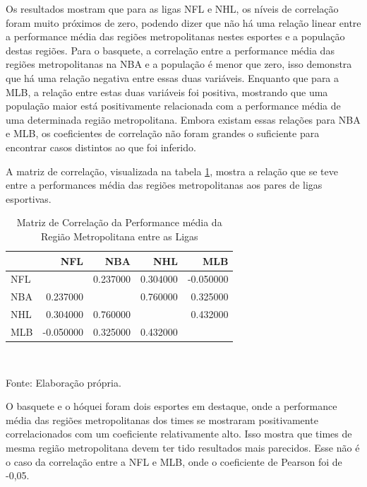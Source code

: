 \documentclass[12pt,oneside,a4paper,chapter=TITLE,english,brazil,sumario=abnt-6027-2012]{abntex2}
\begin{document}
	Os resultados mostram que para as ligas NFL e NHL, os níveis de correlação foram muito próximos de zero, podendo dizer que não há uma relação linear entre a performance média das regiões metropolitanas nestes esportes e a população destas regiões. Para o basquete, a correlação entre a performance média das regiões metropolitanas na NBA e a população é menor que zero, isso demonstra que há uma relação negativa entre essas duas variáveis. Enquanto que para a MLB, a relação entre estas duas variáveis foi positiva, mostrando que uma população maior está positivamente relacionada com a performance média de uma determinada região metropolitana. Embora existam essas relações para NBA e MLB, os coeficientes de correlação não foram grandes o suficiente para encontrar casos distintos ao que foi inferido.
	
	A matriz de correlação, visualizada na tabela \ref{tab:corr_matrix}, mostra a relação que se teve entre a performances média das regiões metropolitanas aos pares de ligas esportivas.

	\begin{table}[H]
	\centering
	\caption{Matriz de Correlação da Performance média da Região Metropolitana entre as Ligas}
	\begin{tabular}{lrrrr}
	& NFL & NBA & NHL & MLB \\\hline
	NFL &  & 0.237000 & 0.304000 & -0.050000 \\\hline
	NBA & 0.237000 &  & 0.760000 & 0.325000 \\\hline
	NHL & 0.304000 & 0.760000 &  & 0.432000 \\\hline
	MLB & -0.050000 & 0.325000 & 0.432000 &  \\\hline
	\end{tabular}
	\label{tab:corr_matrix}
	\\ \vspace{0.25cm}
	\raggedright
	\footnotesize{Fonte: Elaboração própria.}
	\end{table}	

	O basquete e o hóquei foram dois esportes em destaque, onde a performance média das regiões metropolitanas dos times se mostraram positivamente correlacionados com um coeficiente relativamente alto. Isso mostra que times de mesma região metropolitana devem ter tido resultados mais parecidos. Esse não é o caso da correlação entre a NFL e MLB, onde o coeficiente de Pearson foi de -0,05.

	
	
	
\end{document}
